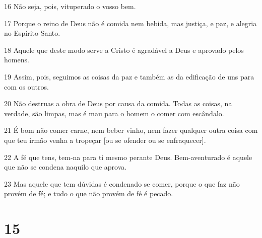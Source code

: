 \par 16 Não seja, pois, vituperado o vosso bem.
\par 17 Porque o reino de Deus não é comida nem bebida, mas justiça, e paz, e alegria no Espírito Santo.
\par 18 Aquele que deste modo serve a Cristo é agradável a Deus e aprovado pelos homens.
\par 19 Assim, pois, seguimos as coisas da paz e também as da edificação de uns para com os outros.
\par 20 Não destruas a obra de Deus por causa da comida. Todas as coisas, na verdade, são limpas, mas é mau para o homem o comer com escândalo.
\par 21 É bom não comer carne, nem beber vinho, nem fazer qualquer outra coisa com que teu irmão venha a tropeçar [ou se ofender ou se enfraquecer].
\par 22 A fé que tens, tem-na para ti mesmo perante Deus. Bem-aventurado é aquele que não se condena naquilo que aprova.
\par 23 Mas aquele que tem dúvidas é condenado se comer, porque o que faz não provém de fé; e tudo o que não provém de fé é pecado.

\chapter{15}

